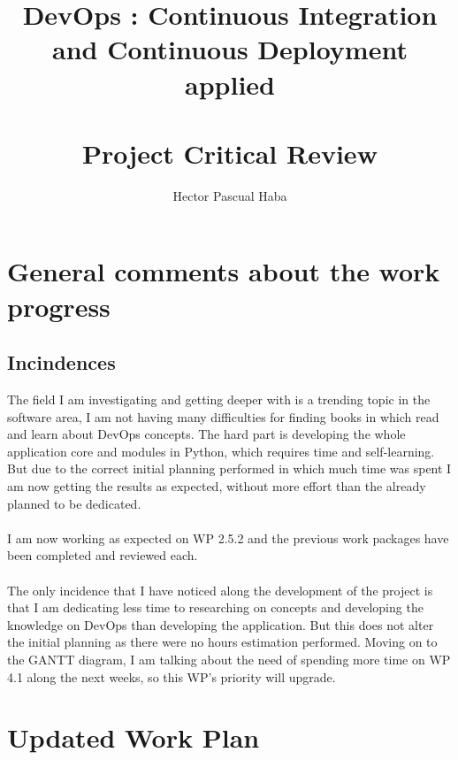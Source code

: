 \documentclass[a4paper]{article}
\title{\textbf{DevOps : Continuous Integration and Continuous Deployment applied} \\~\\
\large \textbf{Project Critical Review}}
\author{Hector Pascual Haba}
\begin{document}
\maketitle 

\section{General comments about the work progress}

\subsection{Incindences}

The field I am investigating and getting deeper with is a trending topic in the software area, I am not having many difficulties for finding books in which read and learn about DevOps concepts. The hard part is developing the whole application core and modules in Python, which requires time and self-learning. But due to the correct initial planning performed in which much time was spent I am now getting the results as expected, without more effort than the already planned to be dedicated.
\\~\\
I am now working as expected on WP 2.5.2 and the previous work packages have been completed and reviewed each.
\\~\\
The only incidence that I have noticed along the development of the project is that I am dedicating less time to researching on concepts and developing the knowledge on DevOps than developing the application. But this does not alter the initial planning as there were no hours estimation performed. Moving on to the GANTT diagram, I am talking about the need of spending more time on WP 4.1 along the next weeks, so this WP's priority will upgrade.


\section{Updated Work Plan}
\end{document}
